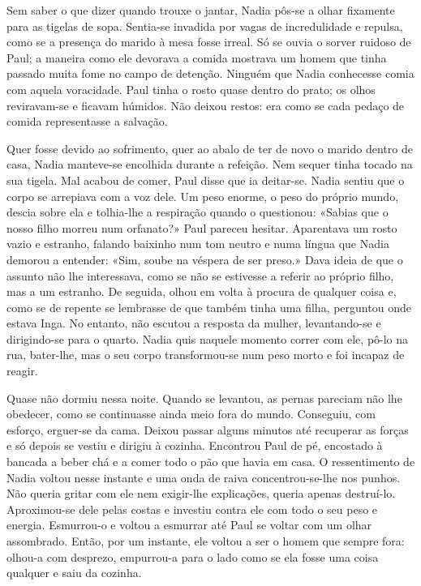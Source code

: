 Sem saber o que dizer quando trouxe o jantar, Nadia pôs-se a olhar
fixamente para as tigelas de sopa. Sentia-se invadida por vagas de
incredulidade e repulsa, como se a presença do marido à mesa fosse
irreal. Só se ouvia o sorver ruidoso de Paul; a maneira como ele
devorava a comida mostrava um homem que tinha passado muita fome no
campo de detenção. Ninguém que Nadia conhecesse comia com aquela
voracidade. Paul tinha o rosto quase dentro do prato; os olhos
reviravam-se e ficavam húmidos. Não deixou restos: era como se cada
pedaço de comida representasse a salvação.

Quer fosse devido ao sofrimento, quer ao abalo de ter de novo o marido
dentro de casa, Nadia manteve-se encolhida durante a refeição. Nem
sequer tinha tocado na sua tigela. Mal acabou de comer, Paul disse que
ia deitar-se. Nadia sentiu que o corpo se arrepiava com a voz dele. Um
peso enorme, o peso do próprio mundo, descia sobre ela e
tolhia-lhe a respiração quando o questionou: «Sabias que o nosso filho
morreu num orfanato?» Paul pareceu hesitar. Aparentava um rosto vazio e
estranho, falando baixinho num tom neutro e numa língua que Nadia
demorou a entender: «Sim, soube na véspera de ser preso.» Dava ideia de
que o assunto não lhe interessava, como se não se estivesse a referir
ao próprio filho, mas a um estranho. De seguida, olhou em volta à
procura de qualquer coisa e, como se de repente se lembrasse de que
também tinha uma filha, perguntou onde estava Inga. No entanto, não
escutou a resposta da mulher, levantando-se e dirigindo-se para o
quarto. Nadia quis naquele momento correr com ele, pô-lo na rua,
bater-lhe, mas o seu corpo transformou-se num peso morto e foi incapaz
de reagir.

Quase não dormiu nessa noite. Quando se levantou, as
pernas pareciam não lhe obedecer, como se continuasse ainda meio fora do
mundo. Conseguiu, com esforço, erguer-se da cama. Deixou passar alguns
minutos até recuperar as forças e só depois se vestiu e dirigiu à
cozinha. Encontrou Paul de pé, encostado à bancada a beber chá e a comer
todo o pão que havia em casa. O ressentimento de Nadia voltou nesse
instante e uma onda de raiva concentrou-se-lhe nos punhos. Não queria
gritar com ele nem exigir-lhe explicações, queria apenas destruí-lo.
Aproximou-se dele pelas costas e investiu contra ele com todo o seu peso
e energia. Esmurrou-o e voltou a esmurrar até Paul se voltar com um
olhar assombrado. Então, por um instante, ele voltou a ser o homem que
sempre fora: olhou-a com desprezo, empurrou-a para o lado como se ela
fosse uma coisa qualquer e saiu da cozinha.

